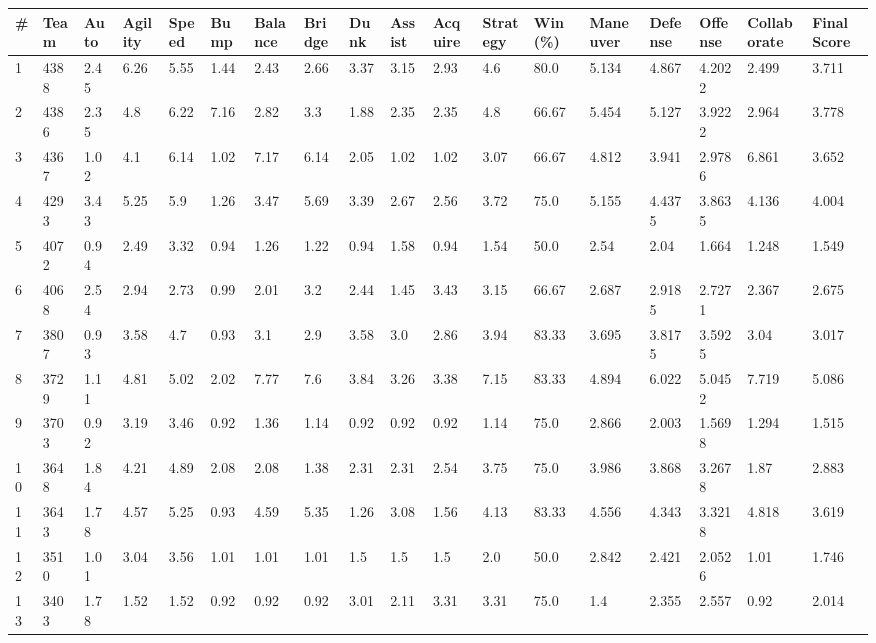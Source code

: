 \documentclass[landscape, 10pt]{report}
\begin{document}
\begin{longtable}{l || l || l | l | l | l | l | l | l | l | l | l | l || l | l | l | l | l} 
\# & Team & Auto & Agility & Speed & Bump & Balance & Bridge & Dunk & Assist & Acquire & Strategy & Win (\%) & Maneuver & Defense & Offense & Collaborate & Final Score \\ \hline \endhead 
\rowcolor{lightgray}1 & 4388 & 2.45 & 6.26 & 5.55 & 1.44 & 2.43 & 2.66 & 3.37 & 3.15 & 2.93 & 4.6 & 80.0 & 5.134 & 4.867 & 4.2022 & 2.499 & 3.711\\ 
2 & 4386 & 2.35 & 4.8 & 6.22 & 7.16 & 2.82 & 3.3 & 1.88 & 2.35 & 2.35 & 4.8 & 66.67 & 5.454 & 5.127 & 3.9222 & 2.964 & 3.778\\ 
\rowcolor{lightgray}3 & 4367 & 1.02 & 4.1 & 6.14 & 1.02 & 7.17 & 6.14 & 2.05 & 1.02 & 1.02 & 3.07 & 66.67 & 4.812 & 3.941 & 2.9786 & 6.861 & 3.652\\ 
4 & 4293 & 3.43 & 5.25 & 5.9 & 1.26 & 3.47 & 5.69 & 3.39 & 2.67 & 2.56 & 3.72 & 75.0 & 5.155 & 4.4375 & 3.8635 & 4.136 & 4.004\\ 
\rowcolor{lightgray}5 & 4072 & 0.94 & 2.49 & 3.32 & 0.94 & 1.26 & 1.22 & 0.94 & 1.58 & 0.94 & 1.54 & 50.0 & 2.54 & 2.04 & 1.664 & 1.248 & 1.549\\ 
6 & 4068 & 2.54 & 2.94 & 2.73 & 0.99 & 2.01 & 3.2 & 2.44 & 1.45 & 3.43 & 3.15 & 66.67 & 2.687 & 2.9185 & 2.7271 & 2.367 & 2.675\\ 
\rowcolor{lightgray}7 & 3807 & 0.93 & 3.58 & 4.7 & 0.93 & 3.1 & 2.9 & 3.58 & 3.0 & 2.86 & 3.94 & 83.33 & 3.695 & 3.8175 & 3.5925 & 3.04 & 3.017\\ 
8 & 3729 & 1.11 & 4.81 & 5.02 & 2.02 & 7.77 & 7.6 & 3.84 & 3.26 & 3.38 & 7.15 & 83.33 & 4.894 & 6.022 & 5.0452 & 7.719 & 5.086\\ 
\rowcolor{lightgray}9 & 3703 & 0.92 & 3.19 & 3.46 & 0.92 & 1.36 & 1.14 & 0.92 & 0.92 & 0.92 & 1.14 & 75.0 & 2.866 & 2.003 & 1.5698 & 1.294 & 1.515\\ 
10 & 3648 & 1.84 & 4.21 & 4.89 & 2.08 & 2.08 & 1.38 & 2.31 & 2.31 & 2.54 & 3.75 & 75.0 & 3.986 & 3.868 & 3.2678 & 1.87 & 2.883\\ 
\rowcolor{lightgray}11 & 3643 & 1.78 & 4.57 & 5.25 & 0.93 & 4.59 & 5.35 & 1.26 & 3.08 & 1.56 & 4.13 & 83.33 & 4.556 & 4.343 & 3.3218 & 4.818 & 3.619\\ 
12 & 3510 & 1.01 & 3.04 & 3.56 & 1.01 & 1.01 & 1.01 & 1.5 & 1.5 & 1.5 & 2.0 & 50.0 & 2.842 & 2.421 & 2.0526 & 1.01 & 1.746\\ 
\rowcolor{lightgray}13 & 3403 & 1.78 & 1.52 & 1.52 & 0.92 & 0.92 & 0.92 & 3.01 & 2.11 & 3.31 & 3.31 & 75.0 & 1.4 & 2.355 & 2.557 & 0.92 & 2.014\\ 

\end{longtable}
\end{document}
